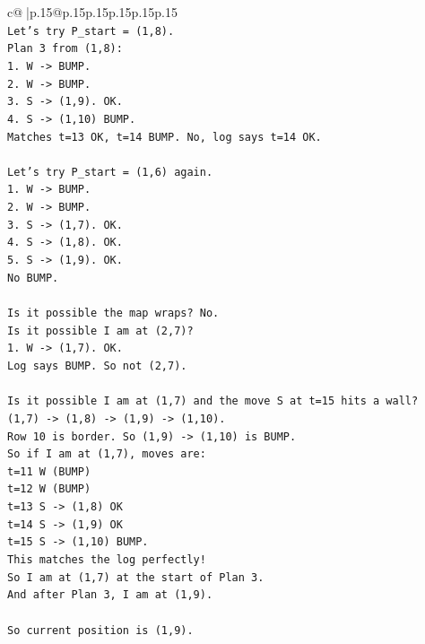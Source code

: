 \documentclass{article}
\begin{document}
{\begin{supertabular}{c@{$\;$}|p{.15\linewidth}@{}p{.15\linewidth}p{.15\linewidth}p{.15\linewidth}p{.15\linewidth}p{.15\linewidth}}
{{{\\ 
\texttt{Let's try P\_start = (1,8).} \\
\texttt{Plan 3 from (1,8):} \\
\texttt{1. W {-}> BUMP.} \\
\texttt{2. W {-}> BUMP.} \\
\texttt{3. S {-}> (1,9). OK.} \\
\texttt{4. S {-}> (1,10) BUMP.} \\
\texttt{Matches t=13 OK, t=14 BUMP. No, log says t=14 OK.} \\
\\ 
\texttt{Let's try P\_start = (1,6) again.} \\
\texttt{1. W {-}> BUMP.} \\
\texttt{2. W {-}> BUMP.} \\
\texttt{3. S {-}> (1,7). OK.} \\
\texttt{4. S {-}> (1,8). OK.} \\
\texttt{5. S {-}> (1,9). OK.} \\
\texttt{No BUMP.} \\
\\ 
\texttt{Is it possible the map wraps? No.} \\
\texttt{Is it possible I am at (2,7)?} \\
\texttt{1. W {-}> (1,7). OK.} \\
\texttt{Log says BUMP. So not (2,7).} \\
\\ 
\texttt{Is it possible I am at (1,7) and the move S at t=15 hits a wall?} \\
\texttt{(1,7) {-}> (1,8) {-}> (1,9) {-}> (1,10).} \\
\texttt{Row 10 is border. So (1,9) {-}> (1,10) is BUMP.} \\
\texttt{So if I am at (1,7), moves are:} \\
\texttt{t=11 W (BUMP)} \\
\texttt{t=12 W (BUMP)} \\
\texttt{t=13 S {-}> (1,8) OK} \\
\texttt{t=14 S {-}> (1,9) OK} \\
\texttt{t=15 S {-}> (1,10) BUMP.} \\
\texttt{This matches the log perfectly!} \\
\texttt{So I am at (1,7) at the start of Plan 3.} \\
\texttt{And after Plan 3, I am at (1,9).} \\
\\ 
\texttt{So current position is (1,9).} \\
}}}
\end{supertabular}}
\end{document}
